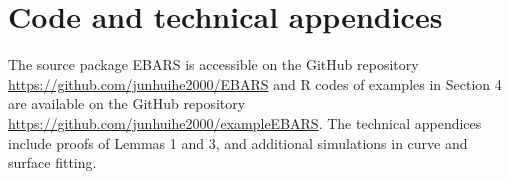 \section{Code and technical appendices}

The source package EBARS is accessible on the GitHub repository \url{https://github.com/junhuihe2000/EBARS} and R codes of examples in Section 4 are available on the GitHub repository \url{https://github.com/junhuihe2000/exampleEBARS}. The technical appendices include proofs of Lemmas 1 and 3, and additional simulations in curve and surface fitting.